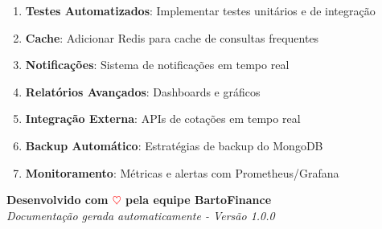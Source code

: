 \documentclass[12pt,a4paper]{article}
\begin{document}
\begin{warningbox}
\begin{enumerate}
    \item \textbf{Testes Automatizados}: Implementar testes unitários e de integração
    \item \textbf{Cache}: Adicionar Redis para cache de consultas frequentes
    \item \textbf{Notificações}: Sistema de notificações em tempo real
    \item \textbf{Relatórios Avançados}: Dashboards e gráficos
    \item \textbf{Integração Externa}: APIs de cotações em tempo real
    \item \textbf{Backup Automático}: Estratégias de backup do MongoDB
    \item \textbf{Monitoramento}: Métricas e alertas com Prometheus/Grafana
\end{enumerate}
\end{warningbox}

\begin{center}
\textbf{Desenvolvido com \textcolor{red}{$\heartsuit$} pela equipe BartoFinance}\\
\textit{Documentação gerada automaticamente - Versão 1.0.0}
\end{center}
\end{document}
